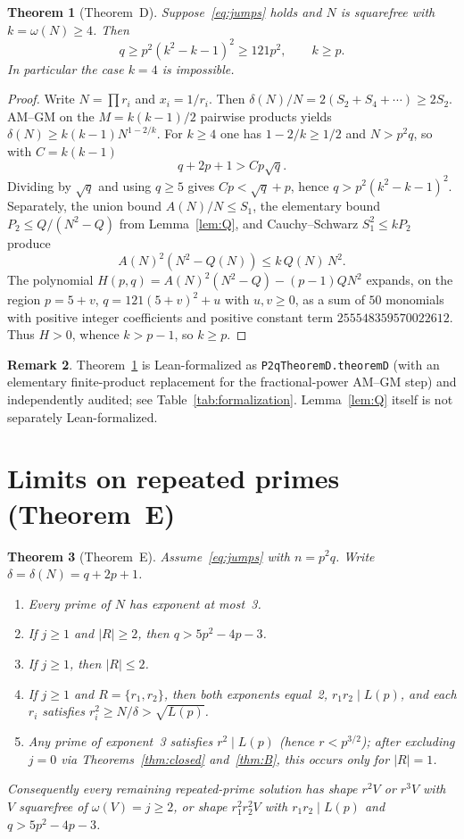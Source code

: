 \documentclass[11pt,reqno]{amsart}
\newtheorem{theorem}{Theorem}
\theoremstyle{definition}
\newtheorem{remark}[theorem]{Remark}
\begin{document}
\begin{theorem}[Theorem~D]
\label{thm:D}
Suppose~\eqref{eq:jumps} holds and \(N\) is squarefree with \(k=\omega(N)\ge 4\). Then
\[
q\ge p^2(k^2-k-1)^2\ge 121p^2,\qquad k\ge p.
\]
In particular the case \(k=4\) is impossible.
\end{theorem}

\begin{proof}
Write \(N=\prod r_i\) and \(x_i=1/r_i\). Then \(\delta(N)/N=2(S_2+S_4+\cdots)\ge 2S_2\). AM--GM on the \(M=k(k-1)/2\) pairwise products yields \(\delta(N)\ge k(k-1)N^{1-2/k}\). For \(k\ge 4\) one has \(1-2/k\ge 1/2\) and \(N>p^2q\), so with \(C=k(k-1)\)
\[
q+2p+1>Cp\sqrt{q}.
\]
Dividing by \(\sqrt{q}\) and using \(q\ge 5\) gives \(Cp<\sqrt{q}+p\), hence \(q>p^2(k^2-k-1)^2\). Separately, the union bound \(A(N)/N\le S_1\), the elementary bound \(P_2\le Q/(N^2-Q)\) from Lemma~\ref{lem:Q}, and Cauchy--Schwarz \(S_1^2\le kP_2\) produce
\[
A(N)^2(N^2-Q(N))\le k\,Q(N)\,N^2.
\]
The polynomial \(H(p,q)=A(N)^2(N^2-Q)-(p-1)QN^2\) expands, on the region \(p=5+v\), \(q=121(5+v)^2+u\) with \(u,v\ge 0\), as a sum of \(50\) monomials with positive integer coefficients and positive constant term \(255548359570022612\). Thus \(H>0\), whence \(k>p-1\), so \(k\ge p\).
\end{proof}

\begin{remark}
Theorem~\ref{thm:D} is Lean-formalized as \texttt{P2qTheoremD.theoremD} (with an elementary finite-product replacement for the fractional-power AM--GM step) and independently audited; see Table~\ref{tab:formalization}. Lemma~\ref{lem:Q} itself is not separately Lean-formalized.
\end{remark}

\section{Limits on repeated primes (Theorem~E)}
\label{sec:thmE}

\begin{theorem}[Theorem~E]
\label{thm:E}
Assume~\eqref{eq:jumps} with \(n=p^2q\). Write \(\delta=\delta(N)=q+2p+1\).
\begin{enumerate}
\item Every prime of \(N\) has exponent at most~3.
\item If \(j\ge 1\) and \(|R|\ge 2\), then \(q>5p^2-4p-3\).
\item If \(j\ge 1\), then \(|R|\le 2\).
\item If \(j\ge 1\) and \(R=\{r_1,r_2\}\), then both exponents equal~2, \(r_1r_2\mid L(p)\), and each \(r_i\) satisfies \(r_i^2\ge N/\delta>\sqrt{L(p)}\).
\item Any prime of exponent~3 satisfies \(r^2\mid L(p)\) (hence \(r<p^{3/2}\)); after excluding \(j=0\) via Theorems~\ref{thm:closed} and~\ref{thm:B}, this occurs only for \(|R|=1\).
\end{enumerate}
Consequently every remaining repeated-prime solution has shape \(r^2V\) or \(r^3V\) with \(V\) squarefree of \(\omega(V)=j\ge 2\), or shape \(r_1^2r_2^2V\) with \(r_1r_2\mid L(p)\) and \(q>5p^2-4p-3\).
\end{theorem}
\end{document}
